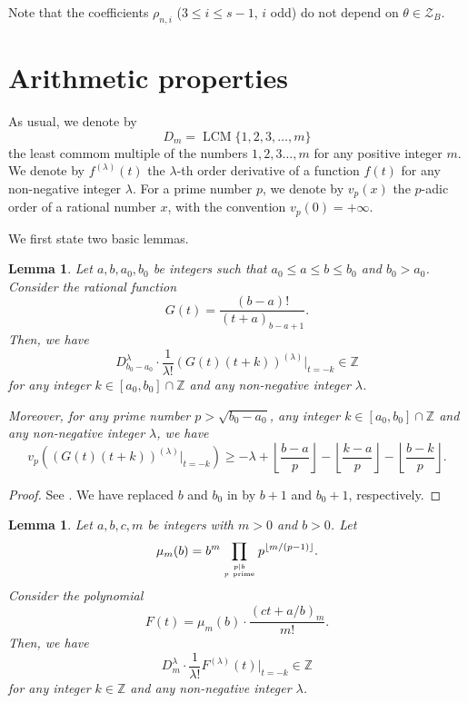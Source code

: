 \documentclass[12pt]{article}
\newtheorem{lemma}[theorem]{Lemma}
\numberwithin{equation}{section}
\begin{document}
\medskip

Note that the coefficients $\rho_{n,i}$ ($3 \leqslant i \leqslant s-1$, $i$ odd) do not depend on $\theta \in \mathcal{Z}_B$. 



\section{Arithmetic properties}\label{sec_3}

As usual, we denote by
\[ D_m = \operatorname{LCM}\{1,2,3,\ldots,m\} \]
the least commom multiple of the numbers $1,2,3\ldots,m$ for any positive integer $m$. We denote by $f^{(\lambda)}(t)$ the $\lambda$-th order derivative of a function $f(t)$ for any non-negative integer $\lambda$. For a prime number $p$, we denote by $v_p(x)$ the $p$-adic order of a rational number $x$, with the convention $v_p(0)=+\infty$.

We first state two basic lemmas. 

\begin{lemma}\label{lem_G}
Let $a,b,a_0,b_0$ be integers such that $a_0 \leqslant a \leqslant b \leqslant b_0$ and $b_0 > a_0$. Consider the rational function
\[ G(t) = \frac{(b-a)!}{(t+a)_{b-a+1}}. \]
Then, we have
	\begin{equation}\label{lem_G_1}
		D_{b_0-a_0}^{\lambda} \cdot \frac{1}{\lambda!} \left( G(t)(t+k) \right)^{(\lambda)} \big|_{t=-k} \in \mathbb{Z} 
	\end{equation}
for any integer $k \in [a_0,b_0]\cap \mathbb{Z}$ and any non-negative integer $\lambda$. 
	
Moreover, for any prime number $p > \sqrt{b_0-a_0}$, any integer $k \in [a_0,b_0]\cap \mathbb{Z}$ and any non-negative integer $\lambda$, we have
\begin{equation}\label{lem_G_2}
	v_p\left( \left( G(t)(t+k) \right)^{(\lambda)} \big|_{t=-k} \right) \geqslant -\lambda + \left\lfloor \frac{b-a}{p} \right\rfloor - \left\lfloor \frac{k-a}{p} \right\rfloor - \left\lfloor \frac{b-k}{p} \right\rfloor. 
\end{equation}
\end{lemma}

\begin{proof}
See \cite[Lemmas 16,~18]{Zud2004}. We have replaced $b$ and $b_0$ in \cite[Lemma 16,~18]{Zud2004} by $b+1$ and $b_0+1$, respectively.
\end{proof}

\medskip

\begin{lemma}\label{lem_F}
Let $a,b,c,m$ be integers with $m > 0$ and $b>0$. Let 
\[ \mu_m(b) = b^{m} \prod_{p \mid b \atop p ~\text{prime}} p^{\lfloor m/(p-1) \rfloor}. \] 
Consider the polynomial
\[ F(t) = \mu_m(b) \cdot \frac{(ct+a/b)_m}{m!}. \]
Then, we have
\[D_{m}^{\lambda} \cdot \frac{1}{\lambda!}  F^{(\lambda)}(t)  \big|_{t=-k} \in \mathbb{Z}  \]
for any integer $k \in \mathbb{Z}$ and any non-negative integer $\lambda$.
\end{lemma}
\end{document}
